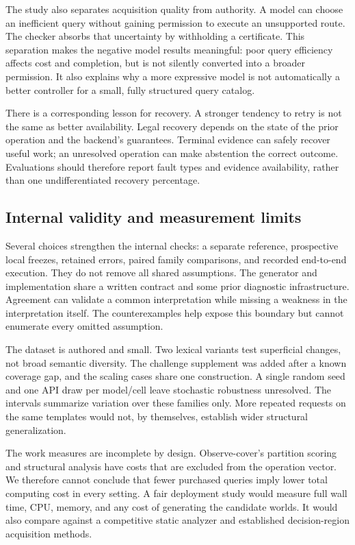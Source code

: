 \documentclass[conference]{IEEEtran}
\begin{document}
The study also separates acquisition quality from authority. A model can choose an inefficient query without gaining permission to execute an unsupported route. The checker absorbs that uncertainty by withholding a certificate. This separation makes the negative model results meaningful: poor query efficiency affects cost and completion, but is not silently converted into a broader permission. It also explains why a more expressive model is not automatically a better controller for a small, fully structured query catalog.

There is a corresponding lesson for recovery. A stronger tendency to retry is not the same as better availability. Legal recovery depends on the state of the prior operation and the backend's guarantees. Terminal evidence can safely recover useful work; an unresolved operation can make abstention the correct outcome. Evaluations should therefore report fault types and evidence availability, rather than one undifferentiated recovery percentage.

\subsection{Internal validity and measurement limits}
Several choices strengthen the internal checks: a separate reference, prospective local freezes, retained errors, paired family comparisons, and recorded end-to-end execution. They do not remove all shared assumptions. The generator and implementation share a written contract and some prior diagnostic infrastructure. Agreement can validate a common interpretation while missing a weakness in the interpretation itself. The counterexamples help expose this boundary but cannot enumerate every omitted assumption.

The dataset is authored and small. Two lexical variants test superficial changes, not broad semantic diversity. The challenge supplement was added after a known coverage gap, and the scaling cases share one construction. A single random seed and one API draw per model/cell leave stochastic robustness unresolved. The intervals summarize variation over these families only. More repeated requests on the same templates would not, by themselves, establish wider structural generalization.

The work measures are incomplete by design. Observe-cover's partition scoring and structural analysis have costs that are excluded from the operation vector. We therefore cannot conclude that fewer purchased queries imply lower total computing cost in every setting. A fair deployment study would measure full wall time, CPU, memory, and any cost of generating the candidate worlds. It would also compare against a competitive static analyzer and established decision-region acquisition methods.
\end{document}
